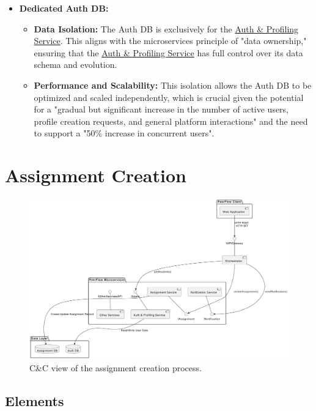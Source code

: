 \begin{itemize}
    \item \textbf{Dedicated Auth DB:}
    \begin{itemize}
        \item \textbf{Data Isolation:} The Auth DB is exclusively for the \hyperref[def:AuthProfilingService]{Auth \& Profiling Service}. This aligns with the microservices principle of "data ownership," ensuring that the \hyperref[def:AuthProfilingService]{Auth \& Profiling Service} has full control over its data schema and evolution.
        \item \textbf{Performance and Scalability:} This isolation allows the Auth DB to be optimized and scaled independently, which is crucial given the potential for a "gradual but significant increase in the number of active users, profile creation requests, and general platform interactions" and the need to support a "50\% increase in concurrent users".
    \end{itemize}
\end{itemize}

\section{Assignment Creation}

\begin{figure}[h]
    \centering
    \includegraphics[width=0.9\linewidth]{Architettura/imgs/assign_create_cnc.pdf}
    \caption{C\&C view of the assignment creation process.}
    \label{fig:ccAssignmentCreation}
\end{figure}

\subsection{Elements}

